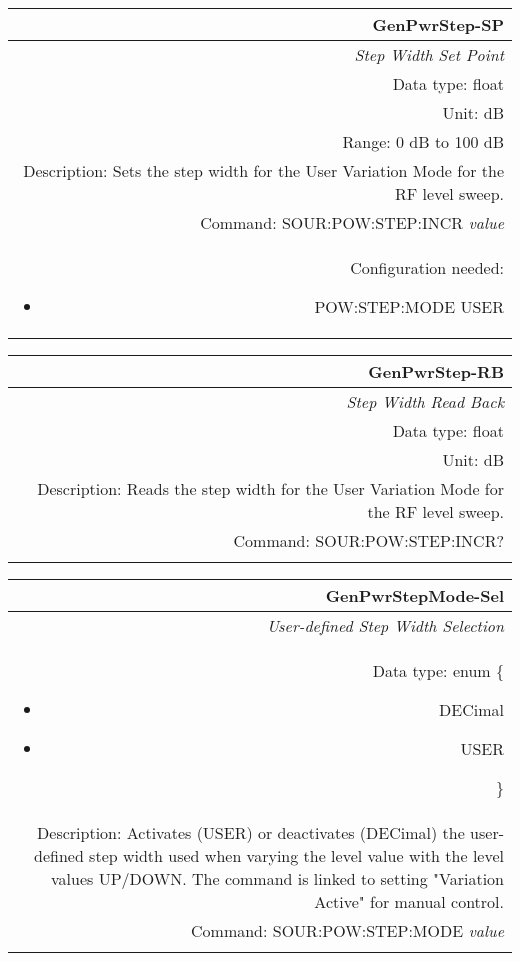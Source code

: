 \documentclass[openany]{article}
\begin{document}
		\begin{tabular}{N}
			\hline
			\bfseries GenPwrStep-SP \\ \hline
			\emph{Step Width Set Point} \\
			Data type: float \\
			Unit: dB \\
			Range: 0 dB to 100 dB \\
			Description: Sets the step width for the User Variation Mode for the RF level sweep. \\
			Command: SOUR:POW:STEP:INCR \emph{value} \\
			Configuration needed: \begin{itemize}[noitemsep]
				\small
				\item[] POW:STEP:MODE USER
			\end{itemize} \\

		\end{tabular}


		\begin{tabular}{N}
			\hline
			\bfseries GenPwrStep-RB \\ \hline
			\emph{Step Width Read Back} \\
			Data type: float \\
			Unit: dB \\
			Description: Reads the step width for the User Variation Mode for the RF level sweep. \\
			Command: SOUR:POW:STEP:INCR? \\
			\\

		\end{tabular}


		\begin{tabular}{N}
			\hline
			\bfseries GenPwrStepMode-Sel \\ \hline
			\emph{User-defined Step Width Selection} \\
			Data type: enum \{\begin{itemize}[noitemsep]
				\small
				\item[] DECimal
				\item[] USER
			\end{itemize}\} \\
			Description: Activates (USER) or deactivates (DECimal) the user-defined step width used when varying the level value with the level values UP/DOWN. The command is linked to setting "Variation Active" for manual control. \\
			Command: SOUR:POW:STEP:MODE \emph{value} \\
			\\

		\end{tabular}
\end{document}
